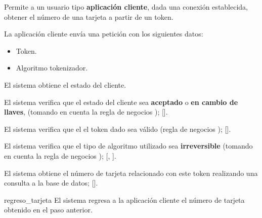%
%

{
  Permite a un usuario tipo \textbf{aplicación cliente}, dada una conexión
  establecida, obtener el número de una tarjeta a partir de un token.

  \begin{trayectoriaPrincipal}

    \item La aplicación cliente envía una petición con los siguientes datos:
      \begin{itemize}
        \item Token.
        \item Algoritmo tokenizador.
      \end{itemize}

    \item El sistema obtiene el estado del cliente.

    \item El sistema verifica que el estado del cliente sea \textbf{aceptado}
      o \textbf{en cambio de llaves}, (tomando en cuenta la regla de negocios
      );
      [].

    \item El sistema verifica que el el token dado sea válido (regla de
      negocios );
      [].

    \item El sistema verifica que el tipo de algoritmo utilizado sea
      \textbf{irreversible} (tomando en cuenta la regla de negocios
      );
      [,
      ].

    \item El sistema obtiene el número de tarjeta relacionado con este token
      realizando una consulta a la base de datos;
      [].

    \item [regreso_tarjeta] El sistema regresa a la aplicación cliente el número
      de tarjeta obtenido en el paso anterior.

  \end{trayectoriaPrincipal}


}
